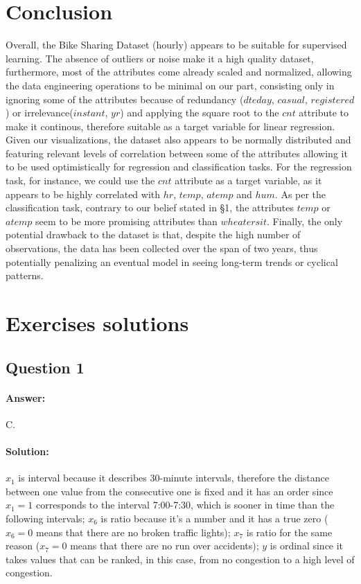\documentclass[11pt,a4paper]{article}
\begin{document}
\section{Conclusion}

Overall, the Bike Sharing Dataset (hourly) appears to be suitable for supervised learning. The absence of outliers or noise make it a high quality dataset, furthermore, most of the attributes come already scaled and normalized, allowing the data engineering operations to be minimal on our part, consisting only in ignoring some of the attributes because of redundancy ($dteday$, $casual$, $registered$) or irrelevance($instant$, $yr$) and applying the square root to the $cnt$ attribute to make it continous, therefore suitable as a target variable for linear regression.
Given our visualizations, the dataset also appears to be normally distributed and featuring relevant levels of correlation between some of the attributes allowing it to be used optimistically for regression and classification tasks.  For the regression task, for instance, we could use the $cnt$ attribute as a target variable, as it appears to be highly correlated with $hr$, $temp$, $atemp$ and $hum$. As per the classification task, contrary to our belief stated in §1, the attributes $temp$ or $atemp$ seem to be more promising attributes than $wheatersit$.
Finally, the only potential drawback to the dataset is that, despite the high number of observations, the data has been collected over the span of two years, thus potentially penalizing an eventual model in seeing long-term trends or cyclical patterns.

\pagebreak
\appendix
\label{appendix:ex}
\section{Exercises solutions}

\subsection{Question 1}

\paragraph*{Answer:} C.
\paragraph*{Solution:} 
$x_1$ is interval because it describes 30-minute intervals, therefore the distance between one value from the consecutive one is fixed and it has an order since $x_1 = 1$ corresponds to the interval 7:00-7:30, which is sooner in time than the following intervals; $x_6$ is ratio because it's a number and it has a true zero ($x_6 = 0$ means that there are no broken traffic lights); $x_7$ is ratio for the same reason ($x_7 = 0$ means that there are no run over accidents); $y$ is ordinal since it takes values that can be ranked, in this case, from no congestion to a high level of congestion.
\end{document}

